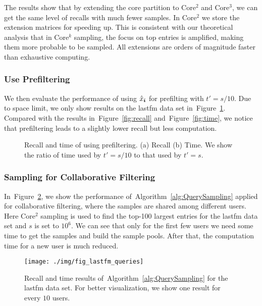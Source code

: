\documentclass[letterpaper]{article}
\newcommand{\V}[1]{{\boldsymbol{{\MakeLowercase{#1}}}}}
\newcommand{\predx}{\hat{x}_{\V{i}}}
\newcommand{\Fig}[1]{Figure~\ref{fig:#1}}
\newcommand{\Alg}[1]{Algorithm~\ref{alg:#1}}
\begin{document}
The results show that by extending the core partition to Core$^2$ and Core$^3$,
we can get the same level of recalls with much fewer samples.
In Core$^2$ we store the extension matrices for speeding up.
This is consistent with our theoretical analysis that in Core$^k$ sampling,
the focus on top entries is amplified, 
making them more probable to be sampled. 
All extensions are orders of magnitude faster than exhaustive computing.

\subsubsection{Use Prefiltering}
We then evaluate the performance of using $\predx$ for prefilting with $t'=s/10$. 
Due to space limit, we only show results on the lastfm data set in~\Fig{lastfm_budget}. 
Compared with the results in~\Fig{recall} and~\Fig{time},
we notice that prefiltering leads to a slightly lower recall but less computation.
\begin{figure}[H]
    \centering   
\caption{Recall and time of using prefiltering. 
        (a) Recall (b) Time. 
        We show the ratio of time used by $t'=s/10$ to that used by $t'=s$.}
\label{fig:lastfm_budget}    
\end{figure}
\subsubsection{Sampling for Collaborative Filtering}
In~\Fig{Queries}, we show the performance of~\Alg{QuerySampling} 
applied for collaborative filtering, 
where the samples are shared among different users. 
Here Core$^2$ sampling is used to find the top-100 largest entries for the lastfm data set
and $s$ is set to $10^6$. 
We can see that only for the first few users we need some time to get the samples 
and build the sample pools. 
After that, the computation time for a new user is much reduced.
\begin{figure}[!]
  \centering
  \texttt{[image: ./img/fig\_lastfm\_queries]}\\
  \caption{Recall and time results of~\Alg{QuerySampling} for the lastfm data set.
           For better visualization, we show one result for every $10$ users.}
  \label{fig:Queries}
\end{figure}
\end{document}
